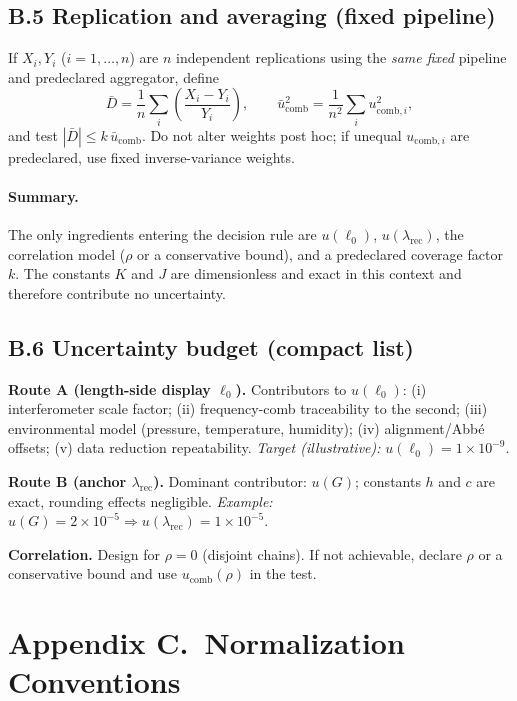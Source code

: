 \documentclass[11pt]{article}
\begin{document}
\subsection*{B.5 Replication and averaging (fixed pipeline)}
If \(X_i,Y_i\) (\(i=1,\dots,n\)) are \(n\) independent replications using the \emph{same fixed} pipeline and predeclared aggregator, define
\[
\bar{D}=\frac{1}{n}\sum_i \left(\frac{X_i-Y_i}{Y_i}\right),\qquad
\bar{u}_{\mathrm{comb}}^2=\frac{1}{n^2}\sum_i u_{\mathrm{comb},i}^2,
\]
and test \(|\bar{D}| \le k\,\bar{u}_{\mathrm{comb}}\). Do not alter weights post hoc; if unequal \(u_{\mathrm{comb},i}\) are predeclared, use fixed inverse-variance weights.

\paragraph{Summary.}
The only ingredients entering the decision rule are \(u(\ell_0)\), \(u(\lambda_{\mathrm{rec}})\), the correlation model (\(\rho\) or a conservative bound), and a predeclared coverage factor \(k\). The constants \(K\) and \(J\) are dimensionless and exact in this context and therefore contribute no uncertainty.

\subsection*{B.6 Uncertainty budget (compact list)}
\textbf{Route A (length-side display \(\ell_0\)).} Contributors to \(u(\ell_0)\): (i) interferometer scale factor; (ii) frequency-comb traceability to the second; (iii) environmental model (pressure, temperature, humidity); (iv) alignment/Abbé offsets; (v) data reduction repeatability. \emph{Target (illustrative):} \(u(\ell_0)=1\times10^{-9}\).

\textbf{Route B (anchor \(\lambda_{\mathrm{rec}}\)).} Dominant contributor: \(u(G)\); constants \(h\) and \(c\) are exact, rounding effects negligible. \emph{Example:} \(u(G)=2\times10^{-5}\Rightarrow u(\lambda_{\mathrm{rec}})=1\times10^{-5}\).

\textbf{Correlation.} Design for \(\rho=0\) (disjoint chains). If not achievable, declare \(\rho\) or a conservative bound and use \(u_{\mathrm{comb}}(\rho)\) in the test.

\section*{Appendix C.\ Normalization Conventions}
\end{document}
